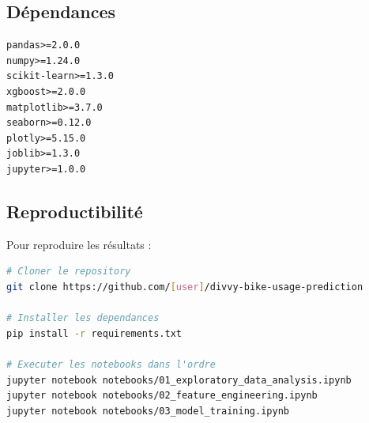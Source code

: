 \documentclass[12pt,a4paper]{article}
\begin{document}
\subsection{Dépendances}

\begin{lstlisting}[caption=requirements.txt]
pandas>=2.0.0
numpy>=1.24.0
scikit-learn>=1.3.0
xgboost>=2.0.0
matplotlib>=3.7.0
seaborn>=0.12.0
plotly>=5.15.0
joblib>=1.3.0
jupyter>=1.0.0
\end{lstlisting}

\subsection{Reproductibilité}

Pour reproduire les résultats :

\begin{lstlisting}[language=bash, caption=Instructions d'exécution]
# Cloner le repository
git clone https://github.com/[user]/divvy-bike-usage-prediction

# Installer les dependances
pip install -r requirements.txt

# Executer les notebooks dans l'ordre
jupyter notebook notebooks/01_exploratory_data_analysis.ipynb
jupyter notebook notebooks/02_feature_engineering.ipynb
jupyter notebook notebooks/03_model_training.ipynb
\end{lstlisting}
\end{document}
